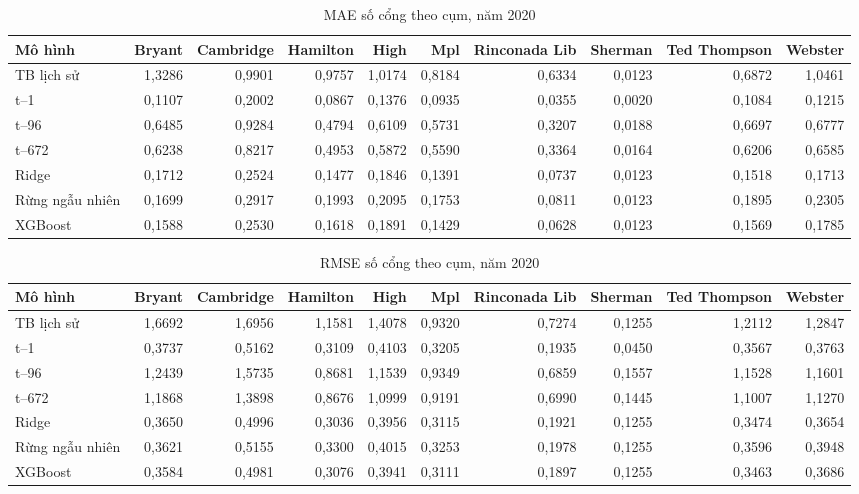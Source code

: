 \documentclass[conference,a4paper]{IEEEtran}
\begin{document}
\begin{table}[!t]
\caption{MAE số cổng theo cụm, năm 2020}
\label{tab:stress_2020_occupancy_ports_MAE}
\centering\footnotesize
\setlength{\tabcolsep}{3pt}
\begin{tabularx}{\textwidth}{@{}Xrrrrrrrrr@{}}
\toprule
\textbf{Mô hình} & \textbf{Bryant} & \textbf{Cambridge} & \textbf{Hamilton} & \textbf{High} & \textbf{Mpl} & \textbf{Rinconada Lib} & \textbf{Sherman} & \textbf{Ted Thompson} & \textbf{Webster} \\
\midrule
TB lịch sử & 1,3286 & 0,9901 & 0,9757 & 1,0174 & 0,8184 & 0,6334 & 0,0123 & 0,6872 & 1,0461 \\
t–1 & 0,1107 & 0,2002 & 0,0867 & 0,1376 & 0,0935 & 0,0355 & 0,0020 & 0,1084 & 0,1215 \\
t–96 & 0,6485 & 0,9284 & 0,4794 & 0,6109 & 0,5731 & 0,3207 & 0,0188 & 0,6697 & 0,6777 \\
t–672 & 0,6238 & 0,8217 & 0,4953 & 0,5872 & 0,5590 & 0,3364 & 0,0164 & 0,6206 & 0,6585 \\
Ridge & 0,1712 & 0,2524 & 0,1477 & 0,1846 & 0,1391 & 0,0737 & 0,0123 & 0,1518 & 0,1713 \\
Rừng ngẫu nhiên & 0,1699 & 0,2917 & 0,1993 & 0,2095 & 0,1753 & 0,0811 & 0,0123 & 0,1895 & 0,2305 \\
XGBoost & 0,1588 & 0,2530 & 0,1618 & 0,1891 & 0,1429 & 0,0628 & 0,0123 & 0,1569 & 0,1785 \\
\bottomrule
\end{tabularx}
\end{table}

\begin{table}[!t]
\caption{RMSE số cổng theo cụm, năm 2020}
\label{tab:stress_2020_occupancy_ports_RMSE}
\centering\footnotesize
\setlength{\tabcolsep}{3pt}
\begin{tabularx}{\textwidth}{@{}Xrrrrrrrrr@{}}
\toprule
\textbf{Mô hình} & \textbf{Bryant} & \textbf{Cambridge} & \textbf{Hamilton} & \textbf{High} & \textbf{Mpl} & \textbf{Rinconada Lib} & \textbf{Sherman} & \textbf{Ted Thompson} & \textbf{Webster} \\
\midrule
TB lịch sử & 1,6692 & 1,6956 & 1,1581 & 1,4078 & 0,9320 & 0,7274 & 0,1255 & 1,2112 & 1,2847 \\
t–1 & 0,3737 & 0,5162 & 0,3109 & 0,4103 & 0,3205 & 0,1935 & 0,0450 & 0,3567 & 0,3763 \\
t–96 & 1,2439 & 1,5735 & 0,8681 & 1,1539 & 0,9349 & 0,6859 & 0,1557 & 1,1528 & 1,1601 \\
t–672 & 1,1868 & 1,3898 & 0,8676 & 1,0999 & 0,9191 & 0,6990 & 0,1445 & 1,1007 & 1,1270 \\
Ridge & 0,3650 & 0,4996 & 0,3036 & 0,3956 & 0,3115 & 0,1921 & 0,1255 & 0,3474 & 0,3654 \\
Rừng ngẫu nhiên & 0,3621 & 0,5155 & 0,3300 & 0,4015 & 0,3253 & 0,1978 & 0,1255 & 0,3596 & 0,3948 \\
XGBoost & 0,3584 & 0,4981 & 0,3076 & 0,3941 & 0,3111 & 0,1897 & 0,1255 & 0,3463 & 0,3686 \\
\bottomrule
\end{tabularx}
\end{table}
\end{document}
